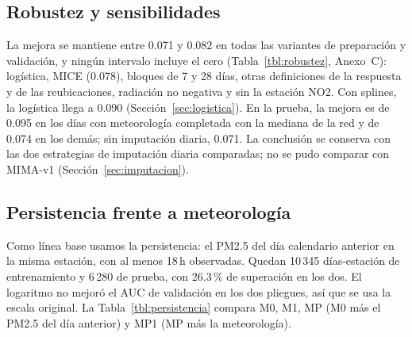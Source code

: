 \subsection{Robustez y sensibilidades}\label{sec:robustez}
La mejora se mantiene entre 0.071 y 0.082 en todas las variantes de preparación y validación, y ningún intervalo incluye el cero (Tabla~\ref{tbl:robustez}, Anexo~C): logística, MICE (0.078), bloques de 7 y 28 días, otras definiciones de la respuesta y de las reubicaciones, radiación no negativa y sin la estación NO2. Con splines, la logística llega a 0.090 (Sección~\ref{sec:logistica}). En la prueba, la mejora es de 0.095 en los días con meteorología completada con la mediana de la red y de 0.074 en los demás; sin imputación diaria, 0.071. La conclusión se conserva con las dos estrategias de imputación diaria comparadas; no se pudo comparar con MIMA-v1 (Sección~\ref{sec:imputacion}).

\subsection{Persistencia frente a meteorología}\label{sec:persistencia}
Como línea base usamos la persistencia: el PM2.5 del día calendario anterior en la misma estación, con al menos 18\,h observadas. Quedan 10\,345 días-estación de entrenamiento y 6\,280 de prueba, con 26.3\,\% de superación en los dos. El logaritmo no mejoró el AUC de validación en los dos pliegues, así que se usa la escala original. La Tabla~\ref{tbl:persistencia} compara M0, M1, MP (M0 más el PM2.5 del día anterior) y MP1 (MP más la meteorología).

